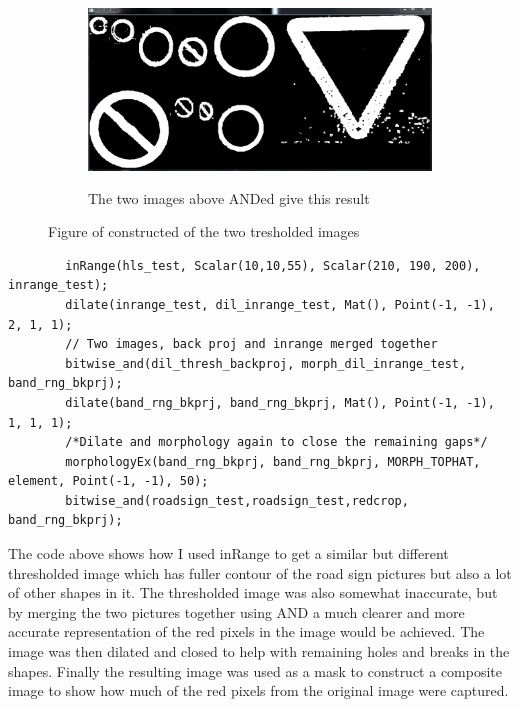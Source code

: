 \documentclass{article}
\begin{document}
\begin{figure}[H]
\center
\begin{subfigure}{0.5\textwidth}
\includegraphics[width=0.9\linewidth, height=5cm]{N_BIT_AND.PNG} 
\caption{The two images above ANDed give this result}
\label{fig:subim1}
\end{subfigure}
\caption{Figure of constructed of the two tresholded images}
\label{fig:image2}
\end{figure}


\begin{lstlisting}
		inRange(hls_test, Scalar(10,10,55), Scalar(210, 190, 200), inrange_test);
		dilate(inrange_test, dil_inrange_test, Mat(), Point(-1, -1), 2, 1, 1);
		// Two images, back proj and inrange merged together
		bitwise_and(dil_thresh_backproj, morph_dil_inrange_test, band_rng_bkprj);
		dilate(band_rng_bkprj, band_rng_bkprj, Mat(), Point(-1, -1), 1, 1, 1);
		/*Dilate and morphology again to close the remaining gaps*/
		morphologyEx(band_rng_bkprj, band_rng_bkprj, MORPH_TOPHAT, element, Point(-1, -1), 50);
		bitwise_and(roadsign_test,roadsign_test,redcrop, band_rng_bkprj);
\end{lstlisting}
The code above shows how I used inRange to get a similar but different thresholded image which has fuller contour of the road sign pictures but also a lot of other shapes in it. The thresholded image was also somewhat inaccurate, but by merging the two pictures  together using AND a much clearer and more accurate representation of the red pixels in the image would be achieved. The image was then dilated and closed to help with remaining holes and breaks in the shapes. Finally the resulting image was used as a mask to construct a composite image to show how much of the red pixels from the original image were captured.
\end{document}
